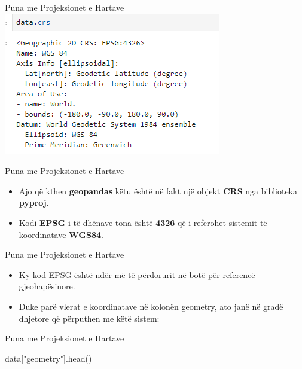 \documentclass[
  ignorenonframetext,
]{beamer}
\newenvironment{Shaded}{\begin{snugshade}}{\end{snugshade}}
\newcommand{\NormalTok}[1]{#1}
\newcommand{\StringTok}[1]{\textcolor[rgb]{0.31,0.60,0.02}{#1}}
\begin{document}
\begin{frame}{Puna me Projeksionet e Hartave}
\protect\hypertarget{puna-me-projeksionet-e-hartave-15}{}
\includegraphics{./Figs/crs.png}
\end{frame}

\begin{frame}{Puna me Projeksionet e Hartave}
\protect\hypertarget{puna-me-projeksionet-e-hartave-16}{}
\begin{itemize}
\item
  Ajo që kthen \textbf{geopandas} këtu është në fakt një objekt
  \textbf{CRS} nga biblioteka \textbf{pyproj}.
\item
  Kodi \textbf{EPSG} i të dhënave tona është \textbf{4326} që i
  referohet sistemit të koordinatave \textbf{WGS84}.
\end{itemize}
\end{frame}

\begin{frame}{Puna me Projeksionet e Hartave}
\protect\hypertarget{puna-me-projeksionet-e-hartave-17}{}
\begin{itemize}
\item
  Ky kod EPSG është ndër më të përdorurit në botë për referencë
  gjeohapësinore.
\item
  Duke parë vlerat e koordinatave në kolonën geometry, ato janë në gradë
  dhjetore që përputhen me këtë sistem:
\end{itemize}
\end{frame}

\begin{frame}[fragile]{Puna me Projeksionet e Hartave}
\protect\hypertarget{puna-me-projeksionet-e-hartave-18}{}

\begin{Shaded}
\begin{Highlighting}[]
\NormalTok{data[}\StringTok{"geometry"}\NormalTok{].head()}
\end{Highlighting}
\end{Shaded}
\end{frame}
\end{document}

